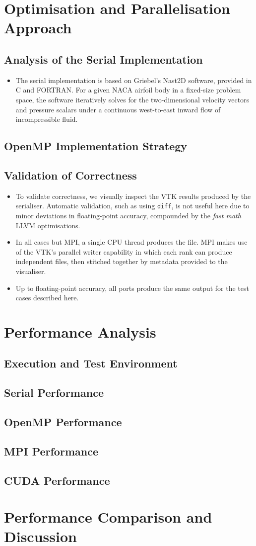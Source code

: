 \documentclass[a4paper]{article}
\begin{document}
\section*{Optimisation and Parallelisation Approach}
\subsection*{Analysis of the Serial Implementation}
\begin{itemize}
    \item The serial implementation is based on Griebel's Nast2D software,
        provided in C and FORTRAN. For a given NACA airfoil body in a fixed-size
        problem space, the software iteratively solves for the two-dimensional
        velocity vectors and pressure scalars under a continuous west-to-east
        inward flow of incompressible fluid.
\end{itemize}
\subsection*{OpenMP Implementation Strategy}
\subsection*{Validation of Correctness}
\begin{itemize}
    \item To validate correctness, we visually inspect the VTK results produced
        by the serialiser. Automatic validation, such as using \texttt{diff}, is
        not useful here due to minor deviations in floating-point accuracy,
        compounded by the \emph{fast math} LLVM optimisations.
    \item In all cases but MPI, a single CPU thread produces the file. MPI makes
        use of the VTK's parallel writer capability in which each rank can
        produce independent files, then stitched together by metadata provided
        to the visualiser.
    \item Up to floating-point accuracy, all ports produce the same output for
        the test cases described here.
\end{itemize}
\section*{Performance Analysis}
\subsection*{Execution and Test Environment}
\subsection*{Serial Performance}
\subsection*{OpenMP Performance}
\subsection*{MPI Performance}
\subsection*{CUDA Performance}

\section*{Performance Comparison and Discussion}
\end{document}
